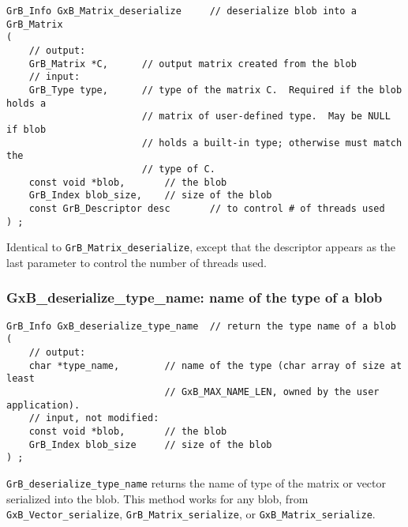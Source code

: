 \documentclass[12pt]{article}
\begin{document}
\begin{mdframed}[userdefinedwidth=6in]
{\footnotesize
\begin{verbatim}
GrB_Info GxB_Matrix_deserialize     // deserialize blob into a GrB_Matrix
(
    // output:
    GrB_Matrix *C,      // output matrix created from the blob
    // input:
    GrB_Type type,      // type of the matrix C.  Required if the blob holds a
                        // matrix of user-defined type.  May be NULL if blob
                        // holds a built-in type; otherwise must match the
                        // type of C.
    const void *blob,       // the blob
    GrB_Index blob_size,    // size of the blob
    const GrB_Descriptor desc       // to control # of threads used
) ;
\end{verbatim}
} \end{mdframed}

Identical to \verb'GrB_Matrix_deserialize', except that the descriptor
appears as the last parameter to control the number of threads used.

\newpage
\subsubsection{{\sf GxB\_deserialize\_type\_name:} name of the type of a blob}
\label{deserialize_type_name}

\begin{mdframed}[userdefinedwidth=6in]
{\footnotesize
\begin{verbatim}
GrB_Info GxB_deserialize_type_name  // return the type name of a blob
(
    // output:
    char *type_name,        // name of the type (char array of size at least
                            // GxB_MAX_NAME_LEN, owned by the user application).
    // input, not modified:
    const void *blob,       // the blob
    GrB_Index blob_size     // size of the blob
) ;
\end{verbatim}
} \end{mdframed}

\verb'GrB_deserialize_type_name' returns the name of type of the matrix or
vector serialized into the blob.  This method works for any blob, from
\verb'GxB_Vector_serialize',
\verb'GrB_Matrix_serialize', or \verb'GxB_Matrix_serialize'.

\newpage
\end{document}
